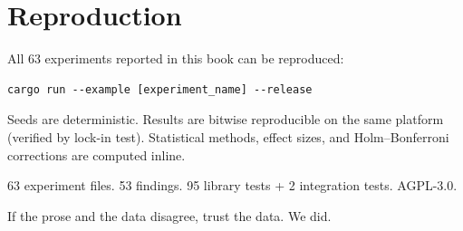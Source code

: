 \documentclass[12pt,a4paper]{book}
\begin{document}
\backmatter




\chapter*{Reproduction}

All 63 experiments reported in this book can be reproduced:

\begin{verbatim}
cargo run --example [experiment_name] --release
\end{verbatim}

Seeds are deterministic. Results are bitwise reproducible on the same platform (verified by lock-in test). Statistical methods, effect sizes, and Holm--Bonferroni corrections are computed inline.

63 experiment files. 53 findings. 95 library tests + 2 integration tests. AGPL-3.0.

If the prose and the data disagree, trust the data. We did.
\end{document}
